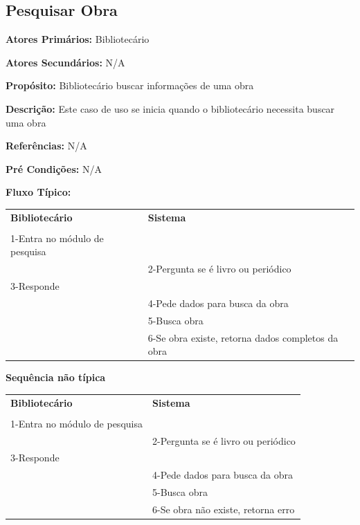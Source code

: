 \documentclass[
	12pt,				%
	openright,			%
	oneside,			%
	a4paper,			%
	english,			%
	brazil				%
	]{abntex2}
\begin{document}
\subsection{Pesquisar Obra}

\textbf{Atores Primários:} Bibliotecário

\textbf{Atores Secundários:} N/A

\textbf{Propósito:}      Bibliotecário buscar informações de uma obra

\textbf{Descrição:}      Este caso de uso se inicia quando o bibliotecário necessita buscar uma obra

\textbf{Referências:}  N/A

\textbf{Pré Condições:} N/A

\textbf{Fluxo Típico:} 

\begin{table}[H]
\ABNTEXfontereduzida
\begin{center}
\begin{tabular}{p{5.5cm} p{5.5cm}}
    \textbf{Bibliotecário} & \textbf{Sistema}\\
     & \\
    1-Entra no módulo de pesquisa & \\
     & 2-Pergunta se é livro ou periódico\\
    3-Responde & \\
     & 4-Pede dados para busca da obra\\
     & 5-Busca obra\\
     & 6-Se obra existe, retorna dados completos da obra\\
\end{tabular}
\end{center}
\end{table} 
                           
\textbf{Sequência não típica}

\begin{table}[H]
\ABNTEXfontereduzida
\begin{center}
\begin{tabular}{p{5.5cm} p{5.5cm}}
    \textbf{Bibliotecário} & \textbf{Sistema}\\
     & \\
    1-Entra no módulo de pesquisa & \\
     & 2-Pergunta se é livro ou periódico\\
    3-Responde & \\
     & 4-Pede dados para busca da obra\\
     & 5-Busca obra\\
     & 6-Se obra não existe, retorna erro\\
\end{tabular}
\end{center}
\end{table} 
\end{document}
